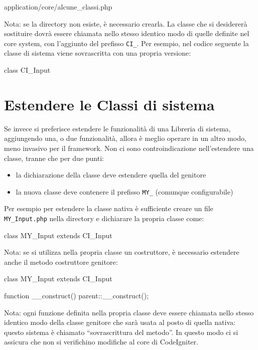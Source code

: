 \begin{code}
application/core/alcune_classi.php
\end{code}

Nota: se la directory non esiste, è necessario crearla. La classe che si desidererà sostituire dovrà essere chiamata nello stesso identico modo di quelle definite nel core system, con l'aggiunto del prefisso \verb|CI_|. Per esempio, nel codice seguente la classe di sistema  viene sovrascritta con una propria versione:

\begin{code}
class CI_Input {

}
\end{code}

\section*{Estendere le Classi di sistema}
Se invece si preferisce estendere le funzionalità di una Libreria di sistema, aggiungendo una, o due funzionalità, allora è meglio operare in un altro modo, meno invasivo per il framework. Non ci sono controindicazione nell'estendere una classe, tranne che per due punti:

\begin{itemize}
\item la dichiarazione della classe deve estendere quella del genitore
\item la nuova classe deve contenere il prefisso \verb|MY_| (comunque configurabile)
\end{itemize}

Per esempio per estendere la classe nativa  è sufficiente creare un file \verb|MY_Input.php| nella directory  e dichiarare la propria classe come:

\begin{code}
class MY_Input extends CI_Input {

}
\end{code}

Nota: se si utilizza nella propria classe un costruttore, è necessario estendere anche il metodo costruttore genitore:

\begin{code}
class MY_Input extends CI_Input {

	function __construct() {
		parent::__construct();
    }
}
\end{code}


Nota: ogni funzione definita nella propria classe deve essere chiamata nello stesso identico modo della classe genitore che sarà usata al posto di quella nativa: questo sistema è chiamato ``sovrascrittura del metodo''. In questo modo ci si assicura che non si verifichino modifiche al core di CodeIgniter.

